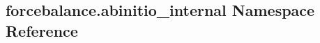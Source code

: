\hypertarget{namespaceforcebalance_1_1abinitio__internal}{\subsection{forcebalance.\-abinitio\-\_\-internal Namespace Reference}
\label{namespaceforcebalance_1_1abinitio__internal}
}
